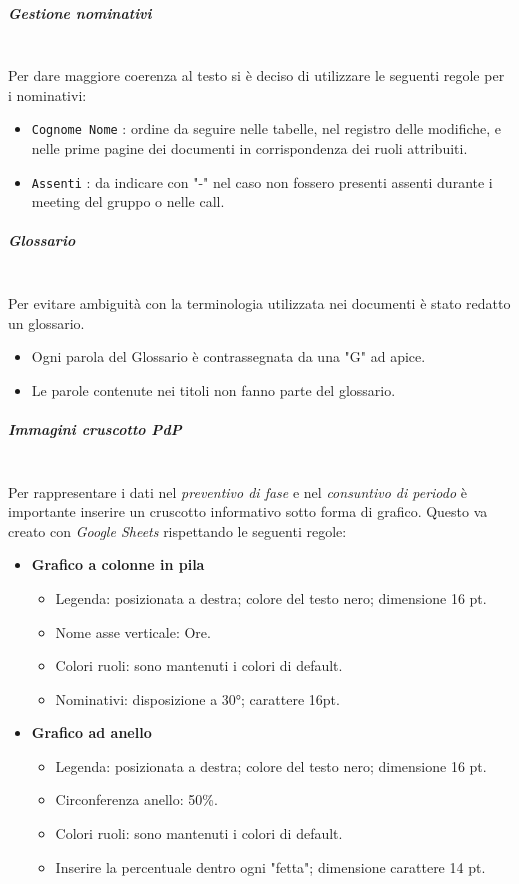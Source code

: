 \subparagraph{Gestione nominativi}
\mbox{}\\
Per dare maggiore coerenza al testo si è deciso di utilizzare le seguenti regole per i nominativi:
\begin{itemize}
	\item \texttt{Cognome Nome} : ordine da seguire nelle tabelle, nel registro delle modifiche, e nelle prime pagine dei documenti in corrispondenza dei ruoli attribuiti.
	\item \texttt{Assenti} : da indicare con "-" nel caso non fossero presenti assenti durante i meeting del gruppo o nelle call.
\end{itemize}

\subparagraph{Glossario}
\mbox{}\\
Per evitare ambiguità con la terminologia utilizzata nei documenti è stato redatto un glossario.
\begin{itemize}
    \item Ogni parola del Glossario è contrassegnata da una "G" ad apice.
    \item Le parole contenute nei titoli non fanno parte del glossario.
\end{itemize}

\subparagraph{Immagini cruscotto PdP}
\mbox{}\\
Per rappresentare i dati nel \textit{preventivo di fase} e nel \textit{consuntivo di periodo}
è importante inserire un cruscotto informativo sotto forma di grafico. Questo va creato con 
\textit{Google Sheets} rispettando le seguenti regole:
\begin{itemize}
    \item \textbf{Grafico a colonne in pila}
    \begin{itemize}
        \item Legenda: posizionata a destra; colore del testo nero; dimensione 16 pt.
        \item Nome asse verticale: Ore.
        \item Colori ruoli: sono mantenuti i colori di default.
        \item Nominativi: disposizione a 30°; carattere 16pt. 
    \end{itemize}
    \item \textbf{Grafico ad anello}
    \begin{itemize}
        \item Legenda: posizionata a destra; colore del testo nero; dimensione 16 pt.
        \item Circonferenza anello: 50\%.
        \item Colori ruoli: sono mantenuti i colori di default.
        \item Inserire la percentuale dentro ogni "fetta"; dimensione carattere 14 pt.
    \end{itemize}
\end{itemize}

